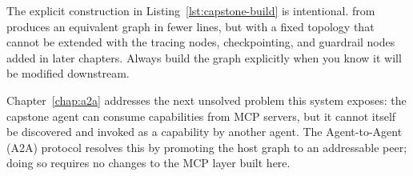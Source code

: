 \begin{notebox}
The explicit  construction in
Listing~\ref{lst:capstone-build} is intentional.
 from  produces
an equivalent graph in fewer lines, but with a fixed topology that
cannot be extended with the tracing nodes, checkpointing, and guardrail
nodes added in later chapters. Always build the graph explicitly when
you know it will be modified downstream.
\end{notebox}

Chapter~\ref{chap:a2a} addresses the next unsolved problem this
system exposes: the capstone agent can consume capabilities from MCP
servers, but it cannot itself be discovered and invoked as a capability
by another agent. The Agent-to-Agent (A2A) protocol resolves this by
promoting the host graph to an addressable peer; doing so requires
no changes to the MCP layer built here.

